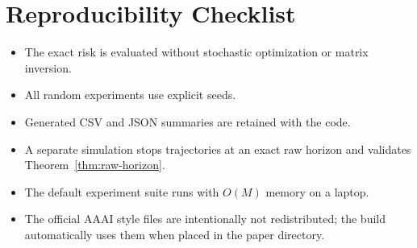 \section{Reproducibility Checklist}

\begin{itemize}[leftmargin=*]
    \item The exact risk is evaluated without stochastic optimization or
    matrix inversion.
    \item All random experiments use explicit seeds.
    \item Generated CSV and JSON summaries are retained with the code.
    \item A separate simulation stops trajectories at an exact raw horizon and
    validates Theorem~\ref{thm:raw-horizon}.
    \item The default experiment suite runs with $O(M)$ memory on a laptop.
    \item The official AAAI style files are intentionally not redistributed;
    the build automatically uses them when placed in the paper directory.
\end{itemize}
